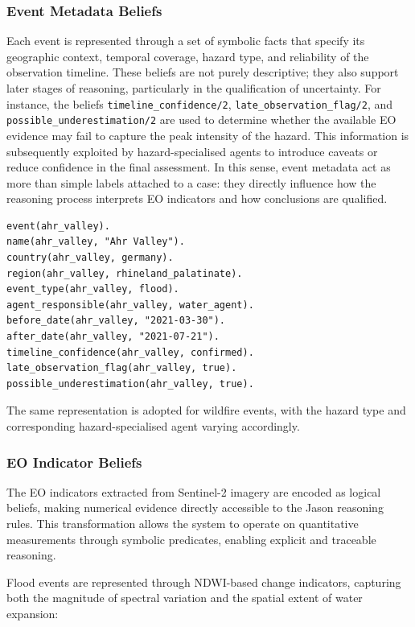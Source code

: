 \documentclass[12pt]{article}
\let\oldtexttt\texttt
\renewcommand{\texttt}[1]{{\fontsize{10.5}{12}\selectfont\oldtexttt{#1}}}
\begin{document}
\subsubsection{Event Metadata Beliefs}

Each event is represented through a set of symbolic facts that specify its geographic context, temporal coverage, hazard type, and reliability of the observation timeline. These beliefs are not purely descriptive; they also support later stages of reasoning, particularly in the qualification of uncertainty. For instance, the beliefs \texttt{timeline\_confidence/2}, \texttt{late\_observation\_flag/2}, and \texttt{possible\_underestimation/2} are used to determine whether the available EO evidence may fail to capture the peak intensity of the hazard. This information is subsequently exploited by hazard-specialised agents to introduce caveats or reduce confidence in the final assessment.
In this sense, event metadata act as more than simple labels attached to a case: they directly influence how the reasoning process interprets EO indicators and how conclusions are qualified.

\begin{lstlisting}
event(ahr_valley).
name(ahr_valley, "Ahr Valley").
country(ahr_valley, germany).
region(ahr_valley, rhineland_palatinate).
event_type(ahr_valley, flood).
agent_responsible(ahr_valley, water_agent).
before_date(ahr_valley, "2021-03-30").
after_date(ahr_valley, "2021-07-21").
timeline_confidence(ahr_valley, confirmed).
late_observation_flag(ahr_valley, true).
possible_underestimation(ahr_valley, true).
\end{lstlisting}

The same representation is adopted for wildfire events, with the hazard type and corresponding hazard-specialised agent varying accordingly.

\subsubsection{EO Indicator Beliefs}

The EO indicators extracted from Sentinel-2 imagery are encoded as logical beliefs, making numerical evidence directly accessible to the Jason reasoning rules. This transformation allows the system to operate on quantitative measurements through symbolic predicates, enabling explicit and traceable reasoning.

Flood events are represented through NDWI-based change indicators, capturing both the magnitude of spectral variation and the spatial extent of water expansion:
\end{document}
